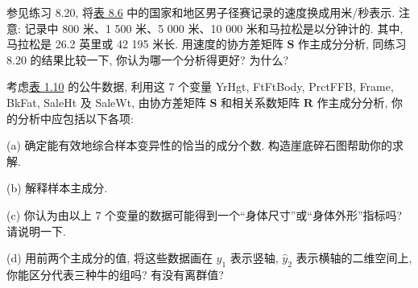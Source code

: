 \vspace{0.5em}

\quad 参见练习 8.20, 将\hyperref[tab:8.6]{表 8.6} 中的国家和地区男子径赛记录的速度换成用米/秒表示. 注意: 记录中 800 米、1 500 米、5 000 米、10 000 米和马拉松是以分钟计的. 其中, 马拉松是 26.2 英里或 42 195 米长. 用速度的协方差矩阵 $\mathbf{S}$ 作主成分分析, 同练习 8.20 的结果比较一下, 你认为哪一个分析得更好? 为什么?

\quad 考虑\hyperref[tab:1.10]{表 1.10} 的公牛数据, 利用这 7 个变量 YrHgt, FtFtBody, PrctFFB, Frame, BkFat, SaleHt 及 SaleWt, 由协方差矩阵 $\mathbf{S}$ 和相关系数矩阵 $\mathbf{R}$ 作主成分分析, 你的分析中应包括以下各项:

(a) 确定能有效地综合样本变异性的恰当的成分个数. 构造崖底碎石图帮助你的求解.

(b) 解释样本主成分.

(c) 你认为由以上 7 个变量的数据可能得到一个“身体尺寸”或“身体外形”指标吗? 请说明一下.

(d) 用前两个主成分的值, 将这些数据画在 $\hat{y}_1$ 表示竖轴, $\hat{y}_2$ 表示横轴的二维空间上, 你能区分代表三种牛的组吗? 有没有离群值?
